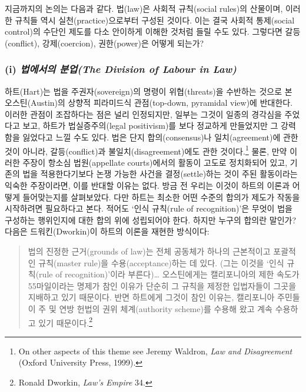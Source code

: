 \documentclass[12pt, oneside]{book}  %
\begin{document}
지금까지의 논의는 다음과 같다. 법(law)은 사회적 규칙(social rules)의
산물이며, 이러한 규칙들 역시 실천(practice)으로부터 구성된 것이다. 이는
결국 사회적 통제(social control)의 수단인 제도를 다소 안이하게 이해한
것처럼 들릴 수도 있다. 그렇다면 갈등(conflict), 강제(coercion),
권한(power)은 어떻게 되는가?

\subsubsection{\texorpdfstring{(i) \emph{법에서의 분업(The Division of
Labour in
Law)}}{(i) 법에서의 분업(The Division of Labour in Law)}}\label{i-uxbc95uxc5d0uxc11cuxc758-uxbd84uxc5c5the-division-of-labour-in-law}

하트(Hart)는 법을 주권자(sovereign)의 명령이 위협(threats)을 수반하는
것으로 본 오스틴(Austin)의 상향적 피라미드식 관점(top-down, pyramidal
view)에 반대한다. 이러한 관점이 조잡하다는 점은 널리 인정되지만, 일부는
그것이 일종의 경각심을 주었다고 보고, 하트가 법실증주의(legal
positivism)를 보다 정교하게 만들었지만 그 강력함을 잃었다고 느낄 수도
있다. 법은 단지 합의(consensus)나 일치(agreement)에 관한 것이 아니라,
갈등(conflict)과 불일치(disagreement)에도 관한 것이다.\footnote{On other
  aspects of this theme see Jeremy Waldron, \emph{Law and Disagreement}
  (Oxford University Press, 1999).} 물론, 만약 이러한 주장이 항소심
법원(appellate courts)에서의 활동이 고도로 정치화되어 있고, 기존의 법을
적용한다기보다 논쟁 가능한 사건을 결정(settle)하는 것이 주된 활동이라는
익숙한 주장이라면, 이를 반대할 이유는 없다. 방금 전 우리는 이것이 하트의
이론과 어떻게 들어맞는지를 살펴보았다. 다만 하트는 최소한 어떤 수준의
합의가 제도가 작동을 시작하려면 필요하다고 본다. 적어도 `인식 규칙(rule
of recognition)'은 무엇이 법을 구성하는 행위인지에 대한 합의 위에
성립되어야 한다. 하지만 누구의 합의란 말인가? 다음은 드워킨(Dworkin)이
하트의 이론을 재현한 방식이다:

\begin{quote}
법의 진정한 근거(grounds of law)는 전체 공동체가 하나의 근본적이고
포괄적인 규칙(master rule)을 수용(acceptance)하는 데 있다. (그는 이것을
`인식 규칙(rule of recognition)'이라 부른다)\ldots{} 오스틴에게는
캘리포니아의 제한 속도가 55마일이라는 명제가 참인 이유가 단순히 그
규칙을 제정한 입법자들이 그곳을 지배하고 있기 때문이다. 반면 하트에게
그것이 참인 이유는, 캘리포니아 주민들이 주 및 연방 헌법의 권위
체계(authority scheme)를 수용해 왔고 계속 수용하고 있기
때문이다.\footnote{Ronald Dworkin, \emph{Law's Empire} 34.}
\end{quote}
\end{document}
